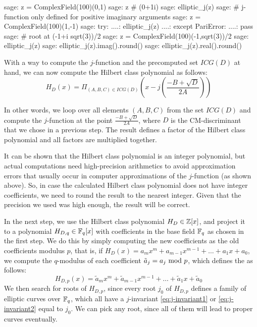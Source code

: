 \begin{sagecommandline}
sage: z = ComplexField(100)(0,1)
sage: z # (0+1i)
sage: elliptic_j(z)
sage: # j-function only defined for positive imaginary arguments
sage: z = ComplexField(100)(1,-1)
sage: try:
....:     elliptic_j(z)
....: except PariError:
....:     pass
sage: # root at (-1+i sqrt(3))/2
sage: z = ComplexField(100)(-1,sqrt(3))/2
sage: elliptic_j(z)
sage: elliptic_j(z).imag().round()
sage: elliptic_j(z).real().round()
\end{sagecommandline}

With a way to compute the $j$-function and the precomputed set $ICG(D)$ at hand, we can now compute the Hilbert class polynomial as follows:
\begin{equation}
H_D(x) = \Pi_{(A,B,C)\in ICG(D)} \left(x - j\left(\frac{-B + \sqrt{D}}{2A}\right)\right)
\end{equation}

In other words, we loop over all elements $(A,B,C)$ from the set $ICG(D)$ and compute the $j$-function at the point $\frac{-B + \sqrt{D}}{2A}$, where $D$ is the CM-discriminant that we chose in a previous step. The result defines a factor of the Hilbert class polynomial and all factors are multiplied together.

It can be shown that the Hilbert class polynomial is an integer polynomial, but actual computations need high-precision arithmetics to avoid approximation errors that usually occur in computer approximations of the $j$-function (as shown above). So, in case the calculated Hilbert class polynomial does not have integer coefficients, we need to round the result to the nearest integer. Given that the precision we used was high enough, the result will be correct.

In the next step, we use the Hilbert class polynomial $H_D\in \mathbb{Z}[x]$, and project it to a polynomial $H_{D,q}\in\mathbb{F}_q[x]$ with coefficients in the base field $\mathbb{F}_q$ as chosen in the first step. We do this by simply computing the new coefficients as the old coefficients modulus $p$, that is, if $H_D(x)= a_mx^m +a_{m-1}x^{m-1}+\ldots + a_1 x + a_0$, we compute the $q$-modulus of each coefficient
$\tilde{a}_j = a_j \text{ mod } p$, which defines the  as follows:
$$
H_{D,p}(x)=\tilde{a}_mx^m +\tilde{a}_{m-1}x^{m-1}+\ldots + \tilde{a}_1 x + \tilde{a}_0
$$
We then search for roots of $H_{D,p}$, since every root $j_0$ of $H_{D,p}$ defines a family of elliptic curves over $\mathbb{F}_q$, which all have a $j$-invariant \ref{eq:j-invariant1} or \ref{eq:j-invariant2} equal to $j_0$. We can pick any root, since all of them will lead to proper curves eventually.

